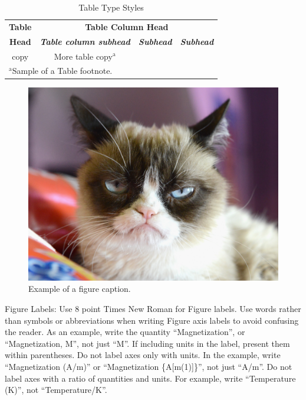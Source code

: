 \documentclass[conference]{IEEEtran}
\begin{document}
\begin{table}[htbp]
    \caption{Table Type Styles}
    \begin{center}
        \begin{tabular}{|c|c|c|c|}
            \hline
            \textbf{Table} & \multicolumn{3}{|c|}{\textbf{Table Column Head}}                                                         \\
            \cline{2-4}
            \textbf{Head}  & \textbf{\textit{Table column subhead}}           & \textbf{\textit{Subhead}} & \textbf{\textit{Subhead}} \\
            \hline
            copy           & More table copy$^{\mathrm{a}}$                   &                           &                           \\
            \hline
            \multicolumn{4}{l}{$^{\mathrm{a}}$Sample of a Table footnote.}
        \end{tabular}
        \label{tab1}
    \end{center}
\end{table}

\begin{figure}[htbp]
    \centerline{\includegraphics{fig/image.jpg}}
    \caption{Example of a figure caption.}
    \label{fig}
\end{figure}

Figure Labels: Use 8 point Times New Roman for Figure labels. Use words rather
than symbols or abbreviations when writing Figure axis labels to avoid
confusing the reader. As an example, write the quantity ``Magnetization'', or
``Magnetization, M'', not just ``M''. If including units in the label, present
them within parentheses. Do not label axes only with units. In the example,
write ``Magnetization (A/m)'' or ``Magnetization \{A[m(1)]\}'', not just
``A/m''. Do not label axes with a ratio of quantities and units. For example,
write ``Temperature (K)'', not ``Temperature/K''.
\end{document}
